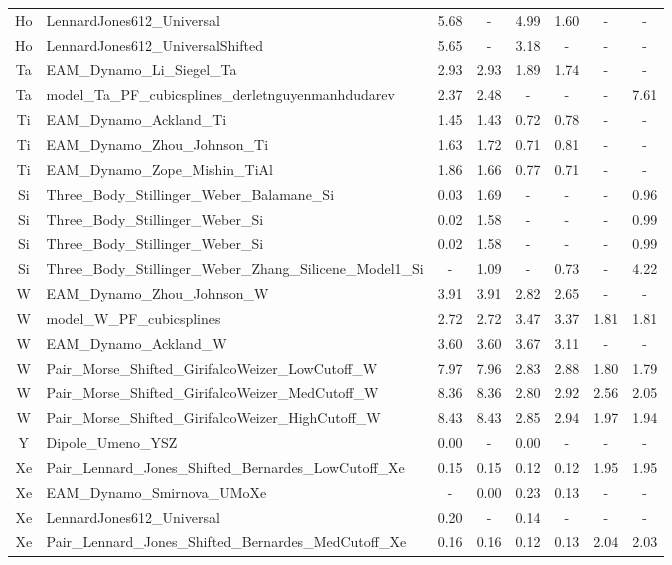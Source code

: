 \documentclass[%
 reprint,
 amsmath,amssymb,
 aps,
]{revtex4-1}
\begin{document}
\begin{longtable*}{@{\extracolsep{\fill}} c l c c c c c c}
 Ho & LennardJones612\_Universal & 5.68 & - & 4.99 & 1.60 & - & - \\
 Ho & LennardJones612\_UniversalShifted & 5.65 & - & 3.18 & - & - & - \\
 Ta & EAM\_Dynamo\_Li\_Siegel\_Ta & 2.93 & 2.93 & 1.89 & 1.74 & - & - \\
 Ta & model\_Ta\_PF\_cubicsplines\_derletnguyenmanhdudarev & 2.37 & 2.48 & - & - & - & 7.61 \\
 Ti & EAM\_Dynamo\_Ackland\_Ti & 1.45 & 1.43 & 0.72 & 0.78 & - & - \\
 Ti & EAM\_Dynamo\_Zhou\_Johnson\_Ti & 1.63 & 1.72 & 0.71 & 0.81 & - & - \\
 Ti & EAM\_Dynamo\_Zope\_Mishin\_TiAl & 1.86 & 1.66 & 0.77 & 0.71 & - & - \\
 Si & Three\_Body\_Stillinger\_Weber\_Balamane\_Si & 0.03 & 1.69 & - & - & - & 0.96 \\
 Si & Three\_Body\_Stillinger\_Weber\_Si & 0.02 & 1.58 & - & - & - & 0.99 \\
 Si & Three\_Body\_Stillinger\_Weber\_Si & 0.02 & 1.58 & - & - & - & 0.99 \\
 Si & Three\_Body\_Stillinger\_Weber\_Zhang\_Silicene\_Model1\_Si & - & 1.09 & - & 0.73 & - & 4.22 \\
 W & EAM\_Dynamo\_Zhou\_Johnson\_W & 3.91 & 3.91 & 2.82 & 2.65 & - & - \\
 W & model\_W\_PF\_cubicsplines & 2.72 & 2.72 & 3.47 & 3.37 & 1.81 & 1.81 \\
 W & EAM\_Dynamo\_Ackland\_W & 3.60 & 3.60 & 3.67 & 3.11 & - & - \\
 W & Pair\_Morse\_Shifted\_GirifalcoWeizer\_LowCutoff\_W & 7.97 & 7.96 & 2.83 & 2.88 & 1.80 & 1.79 \\
 W & Pair\_Morse\_Shifted\_GirifalcoWeizer\_MedCutoff\_W & 8.36 & 8.36 & 2.80 & 2.92 & 2.56 & 2.05 \\
 W & Pair\_Morse\_Shifted\_GirifalcoWeizer\_HighCutoff\_W & 8.43 & 8.43 & 2.85 & 2.94 & 1.97 & 1.94 \\
 Y & Dipole\_Umeno\_YSZ & 0.00 & - & 0.00 & - & - & - \\
 Xe & Pair\_Lennard\_Jones\_Shifted\_Bernardes\_LowCutoff\_Xe & 0.15 & 0.15 & 0.12 & 0.12 & 1.95 & 1.95 \\
 Xe & EAM\_Dynamo\_Smirnova\_UMoXe & - & 0.00 & 0.23 & 0.13 & - & - \\
 Xe & LennardJones612\_Universal & 0.20 & - & 0.14 & - & - & - \\
 Xe & Pair\_Lennard\_Jones\_Shifted\_Bernardes\_MedCutoff\_Xe & 0.16 & 0.16 & 0.12 & 0.13 & 2.04 & 2.03 \\

\end{longtable*}
\end{document}

